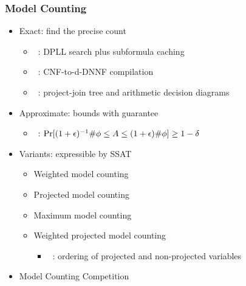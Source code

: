 \begin{frame}
      \frametitle{Model Counting}
      \begin{itemize}
            \item Exact: find the precise count
                  \begin{itemize}
                        \item \cachet~\cite{Sang2004,Sang2005ModelCounting}: DPLL search plus subformula caching
                        \item \ctwod~\cite{Darwiche2001,Darwiche2002dDNNF}: CNF-to-d-DNNF compilation
                        \item \dpmc~\cite{Dudek2020}: project-join tree and arithmetic decision diagrams
                  \end{itemize}
                  \pause
            \item Approximate: bounds with guarantee
                  \begin{itemize}
                        \item \approxmc~\cite{Chakraborty2013,Chakraborty2016}: $\Pr[(1+\epsilon)^{-1}\#\phi \leq A \leq (1+\epsilon)\#\phi] \geq 1-\delta$
                  \end{itemize}
                  \pause
            \item Variants: expressible by SSAT
                  \begin{itemize}
                        \item Weighted model counting~\cite{Sang2005BayesianInference,Chavira2008}
                        \item Projected model counting~\cite{Aziz2015}
                        \item Maximum model counting~\cite{Fremont2017}
                        \item Weighted projected model counting
                              \begin{itemize}
                                    \item \procount~\cite{Dudek2021}: ordering of projected and non-projected variables
                              \end{itemize}
                  \end{itemize}
                  \pause
            \item Model Counting Competition~\cite{MC-COMP2020}
      \end{itemize}
\end{frame}

